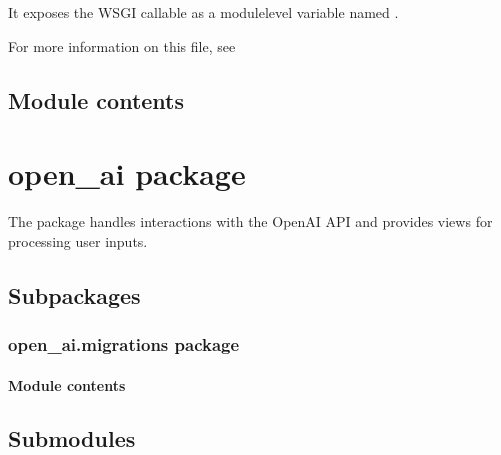 \documentclass[letterpaper,10pt,english]{sphinxmanual}
\begin{document}
\sphinxAtStartPar
It exposes the WSGI callable as a module\sphinxhyphen{}level variable named .

\sphinxAtStartPar
For more information on this file, see


\section{Module contents}
\label{\detokenize{task_management:module-task_management}}\label{\detokenize{task_management:module-contents}}
\sphinxstepscope


\chapter{open\_ai package}
\label{\detokenize{open_ai:open-ai-package}}\label{\detokenize{open_ai::doc}}
\sphinxAtStartPar
The  package handles interactions with the OpenAI API and provides views for processing user inputs.


\section{Subpackages}
\label{\detokenize{open_ai:subpackages}}
\sphinxstepscope


\subsection{open\_ai.migrations package}
\label{\detokenize{open_ai.migrations:open-ai-migrations-package}}\label{\detokenize{open_ai.migrations::doc}}

\subsubsection{Module contents}
\label{\detokenize{open_ai.migrations:module-open_ai.migrations}}\label{\detokenize{open_ai.migrations:module-contents}}

\section{Submodules}
\label{\detokenize{open_ai:submodules}}
\end{document}
